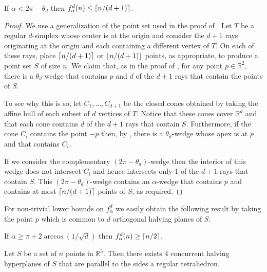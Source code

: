 \documentclass[lotsofwhite]{patmorin}
\begin{document}
\begin{lem}
If $\alpha < 2\pi-\theta_d$ then $f^d_\alpha(n) \le \left\lceil n/(d+1) \right\rceil$.
\end{lem}

\begin{proof} 
We use a generalization of the point set used in the proof of
.  Let $T$ be a regular $d$-simplex whose center is at the
origin and consider the $d+1$ rays originating at the origin and each
containing a different vertex of $T$.  On each of these rays, place
$\left\lceil n/(d+1) \right\rceil$ or $\left\lfloor n/(d+1) \right\rfloor$ points, as appropriate, to
produce a point set $S$ of size $n$.  We claim that, as in the proof
of , for any point $p\in\mathbb{R}^2$, there is a
$\theta_d$-wedge that contains $p$ and $d$ of the $d+1$ rays that
contain the points of $S$. 

To see why this is so, let $C_1,\ldots,C_{d+1}$ be the closed cones
obtained by taking the affine hull of each subset of $d$ vertices of
$T$.  Notice that these cones cover $\mathbb{R}^d$ and that each cone
contains $d$ of the $d+1$ rays that contain $S$.  Furthermore, if the
cone $C_i$ contains the point $-p$ then, by , there
is a $\theta_d$-wedge whose apex is at $p$ and that contains $C_i$.  

If we consider the complementary $(2\pi-\theta_d)$-wedge then the
interior of this wedge does not intersect $C_i$ and hence intersects
only 1 of the $d+1$ rays that contain $S$. This
$(2\pi-\theta_d)$-wedge contains an $\alpha$-wedge that contains $p$
and contains at most $\left\lceil n/(d+1) \right\rceil$ points of $S$, as required.
\end{proof}

For non-trivial lower bounds on $f^d_\alpha$ we easily obtain the
following result by taking the point $p$ which is common to $d$
orthogonal halving planes of $S$.

\begin{lem}
If $\alpha \ge \pi+2\arccos(1/\sqrt{d})$ then $f_\alpha^d(n)\ge \left\lceil n/2 \right\rceil$.
\end{lem}

\begin{lem}
Let $S$ be a set of $n$ points in $\mathbb{R}^3$.  Then there exists
$4$ concurrent halving hyperplanes of $S$ that are parallel to the
sides a regular tetrahedron.
\end{lem}
\end{document}
